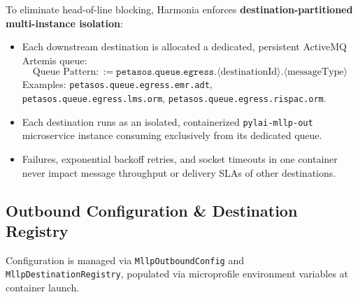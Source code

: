 To eliminate head-of-line blocking, Harmonia enforces \textbf{destination-partitioned multi-instance isolation}:
\begin{itemize}
    \item Each downstream destination is allocated a dedicated, persistent ActiveMQ Artemis queue:
    \begin{equation}
    \text{Queue Pattern} ::= \texttt{petasos.queue.egress.}\langle\text{destinationId}\rangle\texttt{.}\langle\text{messageType}\rangle
    \end{equation}
    Examples: \texttt{petasos.queue.egress.emr.adt}, \texttt{petasos.queue.egress.lms.orm}, \texttt{petasos.queue.egress.rispac.orm}.
    \item Each destination runs as an isolated, containerized \texttt{pylai-mllp-out} microservice instance consuming exclusively from its dedicated queue.
    \item Failures, exponential backoff retries, and socket timeouts in one container never impact message throughput or delivery SLAs of other destinations.
\end{itemize}

\subsection{Outbound Configuration \& Destination Registry}

Configuration is managed via \texttt{MllpOutboundConfig} and \texttt{MllpDestinationRegistry}, populated via microprofile environment variables at container launch.

